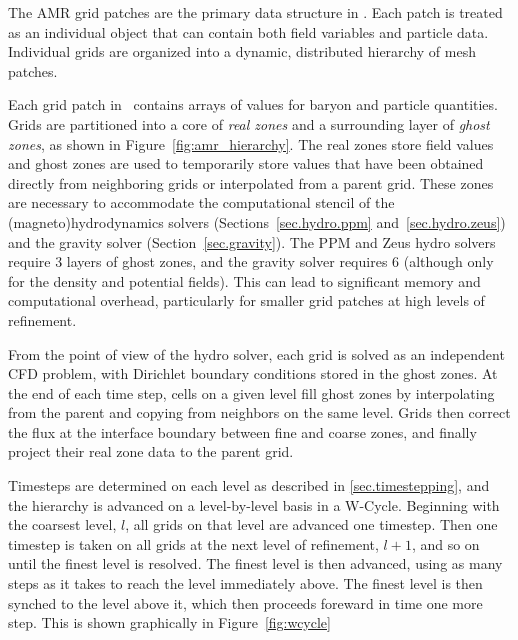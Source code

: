 The AMR grid patches are the primary data structure in \enzo.  Each patch is treated as an individual object that can contain both field variables and particle data.  Individual grids are organized into a  dynamic, distributed hierarchy of mesh patches.  

Each grid patch in \enzo\ contains arrays of values for baryon and particle quantities.   Grids are partitioned into a core of \emph{real zones} and a surrounding layer of \emph{ghost zones}, as shown in Figure~\ref{fig:amr_hierarchy}.  The real zones store field values and ghost zones are used to temporarily store values that have been obtained directly from neighboring grids or interpolated from a parent grid.  These zones are necessary to accommodate the computational stencil of the (magneto)hydrodynamics solvers (Sections~\ref{sec.hydro.ppm} and~\ref{sec.hydro.zeus}) and the gravity solver (Section~\ref{sec.gravity}).  The PPM and Zeus hydro solvers require 3 layers of ghost zones,  and the gravity solver requires 6 (although only for the density and potential fields).  This can lead to significant memory and computational overhead, particularly for smaller grid patches at high levels of refinement.  

From the point of view of the hydro solver, each grid is solved as an independent CFD problem, with Dirichlet boundary conditions stored in the ghost zones.  At the end of each time step, cells on a given level fill ghost zones by interpolating from the parent and copying from neighbors on the same level.  Grids then correct the flux at the interface boundary between fine and coarse zones, and finally project their real zone data to the parent grid. 

Timesteps are determined on each level as described in \ref{sec.timestepping}, and the hierarchy is advanced on
a level-by-level basis in a W-Cycle.    Beginning with the coarsest level, $l$, all grids on that level are advanced one
timestep.  Then one timestep is taken on all grids at the next level of refinement, $l+1$, and so on until the finest level is resolved. The finest level is then advanced, using as many steps as it takes to reach the level immediately above.  The finest level is then synched to the level above it, which then proceeds foreward in time one more step.  This is shown graphically in Figure~\ref{fig:wcycle}

